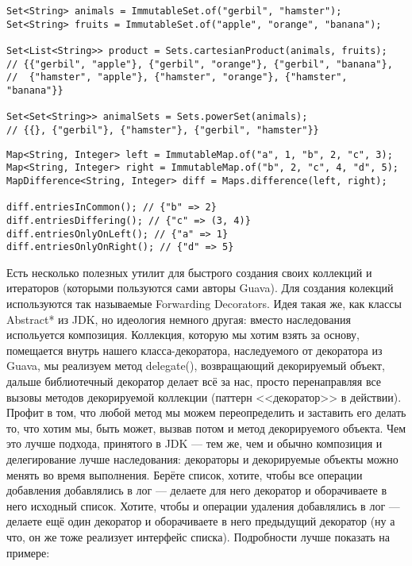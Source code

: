 \documentclass[a5paper,draft]{article}
\begin{document}
\begin{verbatim}
Set<String> animals = ImmutableSet.of("gerbil", "hamster");
Set<String> fruits = ImmutableSet.of("apple", "orange", "banana");

Set<List<String>> product = Sets.cartesianProduct(animals, fruits);
// {{"gerbil", "apple"}, {"gerbil", "orange"}, {"gerbil", "banana"},
//  {"hamster", "apple"}, {"hamster", "orange"}, {"hamster", "banana"}}

Set<Set<String>> animalSets = Sets.powerSet(animals);
// {{}, {"gerbil"}, {"hamster"}, {"gerbil", "hamster"}}
\end{verbatim}

\begin{verbatim}
Map<String, Integer> left = ImmutableMap.of("a", 1, "b", 2, "c", 3);
Map<String, Integer> right = ImmutableMap.of("b", 2, "c", 4, "d", 5);
MapDifference<String, Integer> diff = Maps.difference(left, right);

diff.entriesInCommon(); // {"b" => 2}
diff.entriesDiffering(); // {"c" => (3, 4)}
diff.entriesOnlyOnLeft(); // {"a" => 1}
diff.entriesOnlyOnRight(); // {"d" => 5}
\end{verbatim}

Есть несколько полезных утилит для быстрого создания своих коллекций и итераторов (которыми пользуются сами авторы Guava). Для создания колекций используются так называемые Forwarding Decorators. Идея такая же, как классы Abstract* из JDK, но идеология немного другая: вместо наследования испольуется композиция. Коллекция, которую мы хотим взять за основу, помещается внутрь нашего класса-декоратора, наследуемого от декоратора из Guava, мы реализуем метод delegate(), возвращающий декорируемый объект, дальше библиотечный декоратор делает всё за нас, просто перенаправляя все вызовы методов декорируемой коллекции (паттерн <<декоратор>> в действии). Профит в том, что любой метод мы можем переопределить и заставить его делать то, что хотим мы, быть может, вызвав потом и метод декорируемого объекта. Чем это лучше подхода, принятого в JDK --- тем же, чем и обычно композиция и делегирование лучше наследования: декораторы и декорируемые объекты можно менять во время выполнения. Берёте список, хотите, чтобы все операции добавления добавлялись в лог --- делаете для него декоратор и оборачиваете в него исходный список. Хотите, чтобы и операции удаления добавлялись в лог --- делаете ещё один декоратор и оборачиваете в него предыдущий декоратор (ну а что, он же тоже реализует интерфейс списка). Подробности лучше показать на примере:
\end{document}
